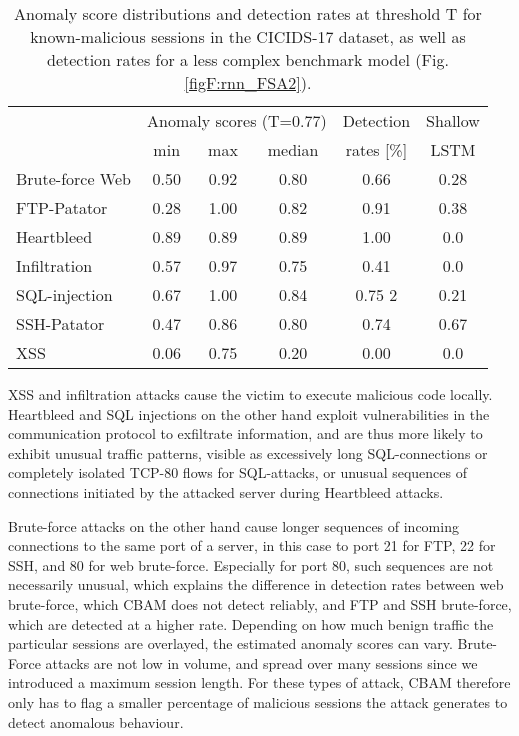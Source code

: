 \begin{table}[ht]
\centering
\begin{tabular}{l|ccc||c|c}
\multicolumn{1}{c|}{ }&\multicolumn{3}{c||}{Anomaly scores (T=0.77)}&Detection&Shallow\\
 &  min  &  max  &  median  & rates [\%] & LSTM\\ 
  \hline
Brute-force Web & 0.50 & 0.92 & 0.80 & 0.66  &0.28 \\ 
  FTP-Patator & 0.28 & 1.00 & 0.82 & 0.91 & 0.38\\ 
  Heartbleed & 0.89 & 0.89 & 0.89 & 1.00 & 0.0\\ 
  Infiltration &0.57& 0.97& 0.75&0.41 &0.0\\ 
  SQL-injection & 0.67 & 1.00 & 0.84 & 0.75 2&0.21\\ 
  SSH-Patator & 0.47 & 0.86 & 0.80 & 0.74 &0.67\\ 
  XSS & 0.06 & 0.75 & 0.20 & 0.00 &0.0\\ 
   \hline
\end{tabular}
\vspace{2pt}
\caption{Anomaly score distributions and detection rates at threshold T for known-malicious sessions in the CICIDS-17 dataset, as well as detection rates for a less complex benchmark model (Fig. \ref{figF:rnn_FSA2}).}
\label{tabF:dfCICinf}
\end{table}

XSS and infiltration attacks cause the victim to execute malicious code locally. Heartbleed and SQL injections on the other hand exploit vulnerabilities in the communication protocol to exfiltrate information, and are thus more likely to exhibit unusual traffic patterns, visible as excessively long SQL-connections or completely isolated TCP-80 flows for SQL-attacks, or unusual sequences of connections initiated by the attacked server during Heartbleed attacks.

Brute-force attacks on the other hand cause longer sequences of incoming connections to the same port of a server, in this case to port 21 for FTP, 22 for SSH, and 80 for web brute-force. Especially for port 80, such sequences are not necessarily unusual, which explains the difference in detection rates between web brute-force, which CBAM does not detect reliably, and FTP and SSH brute-force, which are detected at a higher rate. Depending on how much benign traffic the particular sessions are overlayed, the estimated anomaly scores can vary. Brute-Force attacks are not low in volume, and spread over many sessions since we introduced a maximum session length. For these types of attack, CBAM therefore only has to flag a smaller percentage of malicious sessions the attack generates to detect anomalous behaviour.


